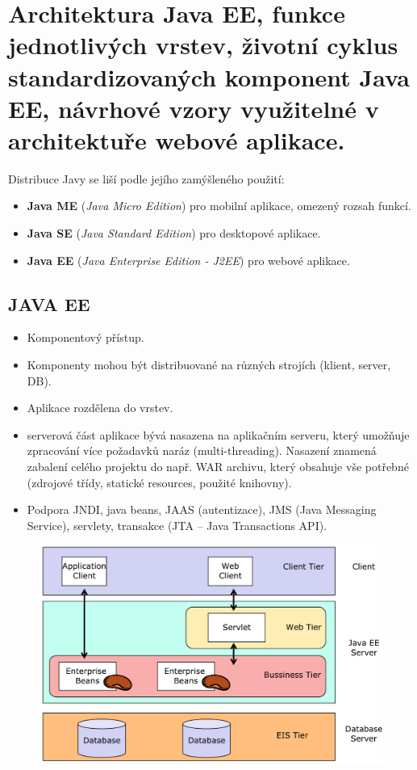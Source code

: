 \section[WA2 - Java EE]{Architektura Java EE, funkce jednotlivých vrstev, životní cyklus standardizovaných komponent Java EE, návrhové vzory využitelné v architektuře webové aplikace.}

Distribuce Javy se liší podle jejího zamýšleného použití:
\begin{itemize}[itemsep=0px]
\item \textbf{Java ME} (\textit{Java Micro Edition}) pro mobilní aplikace, omezený rozsah funkcí.
\item \textbf{Java SE} (\textit{Java Standard Edition}) pro desktopové aplikace.
\item \textbf{Java EE} (\textit{Java Enterprise Edition - J2EE}) pro webové aplikace.
\end{itemize}

\subsection{JAVA EE}
\begin{itemize}[itemsep=0px]
\item Komponentový přístup.
\item Komponenty mohou být distribuované na různých strojích (klient, server, DB).
\item Aplikace rozdělena do vrstev.
\item serverová část aplikace bývá nasazena na aplikačním serveru, který umožňuje zpracování více požadavků naráz (multi-threading). Nasazení znamená zabalení celého projektu do např. WAR archivu, který obsahuje vše potřebné (zdrojové třídy, statické resources, použité knihovny).
\item Podpora JNDI, java beans, JAAS (autentizace), JMS (Java Messaging Service), servlety, transakce (JTA – Java Transactions API).
\end{itemize}

\begin{figure}[h!]
\centering
\includegraphics[width=140mm]{16/images/java-ee-arch}
\end{figure}

